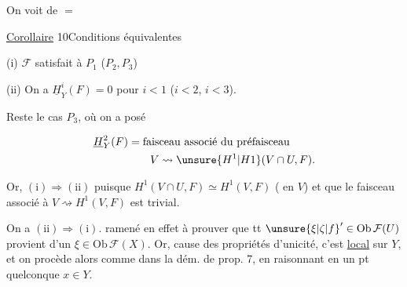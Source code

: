 
On voit de $=$

\uline{Corollaire} 10\quad Conditions équivalentes

(i) $\mathcal F$ satisfait à $P_1$ ($P_2,P_3$)

(ii) On a $\underline H^i_Y(F)=0$ pour $i<1$ ($i<2$, $i<3$).

Reste le cas $P_3$, où on a posé

\[
\begin{aligned}
\underline H^2_Y(F)&=\text{faisceau associé du préfaisceau}\\
&\qquad V\rightsquigarrow \unsure{H^1|H1}(V\cap U,F).
\end{aligned}
\]

Or, $(\mathrm{i})\Rightarrow(\mathrm{ii})$ puisque $H^1(V\cap U,F)\simeq H^1(V,F)$ ( en $V$) et que le faisceau associé à $V\rightsquigarrow H^1(V,F)$ est trivial.

On a $(\mathrm{ii})\Rightarrow(\mathrm{i})$.  ramené en effet à prouver que tt $\unsure{\xi|\zeta|f}'\in\mathrm{Ob}\,\mathcal F(U)$ provient d'un $\xi\in\mathrm{Ob}\,\mathcal F(X)$. Or,  cause des propriétés d'unicité, c'est \uline{local} sur $Y$, et on procède alors comme dans la dém. de prop. 7, en  raisonnant en un pt quelconque $x\in Y$.

